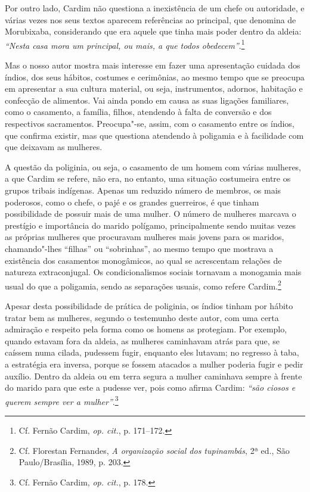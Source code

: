  Por outro lado, Cardim não questiona a inexistência de um
chefe ou autoridade, e várias vezes nos seus textos aparecem
referências ao principal, que denomina de Morubixaba,
considerando que era aquele que tinha mais poder dentro da aldeia:
\textit{``Nesta casa mora um principal, ou mais, a que todos
obedecem''}.\footnote{ Cf. Fernão Cardim, \textit{op. cit.}, p. 171--172.}

Mas o nosso autor mostra mais interesse em fazer uma apresentação
cuidada dos índios, dos seus hábitos, costumes e cerimônias, ao mesmo
tempo que se preocupa em apresentar a sua cultura material, ou seja,
instrumentos, adornos, habitação e confecção de alimentos. Vai ainda
pondo em causa as suas ligações familiares, como o casamento, a
família, filhos, atendendo à falta de conversão e dos respectivos
sacramentos. Preocupa"-se, assim, com o casamento entre os índios, que
confirma existir, mas que questiona atendendo à poligamia e à
facilidade com que deixavam as mulheres.

A questão da poliginia, ou seja, o casamento de um homem com
várias mulheres, a que Cardim se refere, não era, no entanto, uma
situação costumeira entre os grupos tribais indígenas. Apenas um
reduzido número de membros, os mais poderosos, como o chefe, o pajé e
os grandes guerreiros, é que tinham possibilidade de possuir mais de uma
mulher. O número de mulheres marcava o prestígio e importância do
marido polígamo, principalmente sendo muitas vezes as próprias mulheres
que procuravam mulheres mais jovens para os maridos, chamando"-lhes
``filhas'' ou ``sobrinhas'', ao mesmo tempo que mostrava a existência dos
casamentos monogâmicos, ao qual se acrescentam relações de natureza
extraconjugal. Os condicionalismos sociais tornavam a monogamia mais
usual do que a poligamia, sendo as separações usuais, como refere
Cardim.\footnote{ Cf. Florestan Fernandes, \textit{A organização
social dos tupinambás}, 2ª ed., São Paulo/Brasília, 1989, p. 203.}

Apesar desta possibilidade de prática de poliginia, os índios tinham
por hábito tratar bem as mulheres, segundo o testemunho deste autor,
com uma certa admiração e respeito pela forma como os homens as
protegiam. Por exemplo, quando estavam fora da aldeia, as mulheres
caminhavam atrás para que, se caíssem numa cilada, pudessem fugir,
enquanto eles lutavam; no regresso à taba, a estratégia era inversa,
porque se fossem atacados a mulher poderia fugir e pedir auxílio.
Dentro da aldeia ou em terra segura a mulher caminhava sempre à frente
do marido para que este a pudesse ver, pois como afirma Cardim:
\textit{``são ciosos e querem sempre ver a 
mulher''}.\footnote{ Cf. Fernão Cardim, \textit{op. cit.}, p. 178.} 

